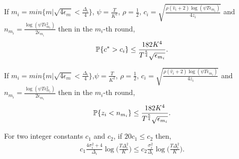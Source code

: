 \begin{lemma}
\label{proofTheorem:Lemma:4}
If $m_i = min\lbrace m|\sqrt{4\epsilon_{m} } < \frac{\Delta_i}{4} \rbrace $, $\psi=\frac{T}{ K^2}$, $\rho=\frac{1}{2}$, $c_{i} =\sqrt{\frac{\rho(\hat{v}_i + 2)\log (\psi T\epsilon_{m_{i}})}{4 z_{i}}}$ and $n_{m_i}=\frac{\log{(\psi T\epsilon_{m_{i}}^{2})}}{2\epsilon_{m_{i}}}$ then in the $m_i$-th round, 
\begin{align*}
\mathbb{P}\lbrace c^{*} > c_i \rbrace  \leq \dfrac{182 K^4}{T^{\frac{5}{4}}\sqrt{\epsilon_{m_i}}}.
\end{align*}
\end{lemma}



\begin{lemma}
\label{proofTheorem:Lemma:5}
If $m_i = min\lbrace m|\sqrt{4\epsilon_{m} } < \frac{\Delta_i}{4} \rbrace $,$\psi=\frac{T}{ K^2}$, $\rho=\frac{1}{2}$, $c_{i} =\sqrt{\frac{\rho (\hat{v}_i + 2)\log (\psi T\epsilon_{m_{i}})}{4 z_i}}$ and $n_{m_i}=\frac{\log{(\psi T\epsilon_{m_{i}}^{2})}}{2\epsilon_{m_{i}}}$ then in the $m_i$-th round, 
\begin{align*}
\mathbb{P}\lbrace z_i < n_{m_i} \rbrace  \leq \dfrac{182 K^4}{T^{\frac{5}{4}}\sqrt{\epsilon_{m_i}}}.
\end{align*}
\end{lemma}









\begin{lemma}
\label{proofTheorem:Lemma:6}
For two integer constants $c_1$ and $c_2$, if $20 c_1 \leq c_2$ then,
\begin{align*}
c_1 \frac{4\sigma_i^2 + 4}{\Delta_i}\log\bigg( \frac{T\Delta_i^2}{K}\bigg) \leq c_2 \frac{\sigma_i^2}{\Delta_i}\log\bigg( \frac{T\Delta_i^2}{K}\bigg).
\end{align*}
\end{lemma}


